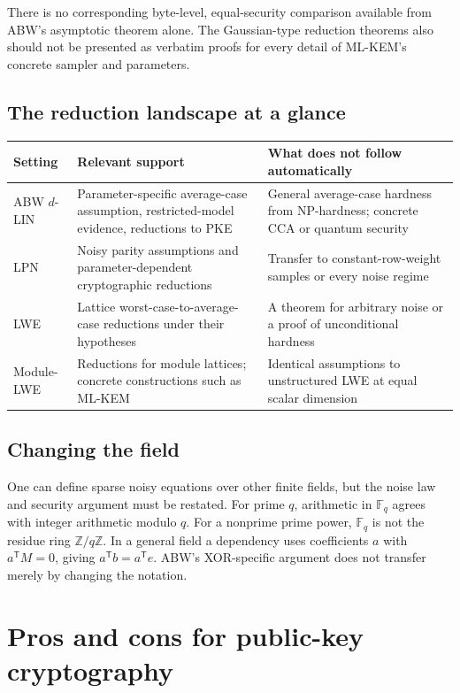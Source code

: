\documentclass[11pt,a4paper]{article}
\newcommand{\F}{\mathbb F}
\newcommand{\Z}{\mathbb Z}
\begin{document}
There is no corresponding byte-level, equal-security comparison available from ABW's asymptotic theorem alone. The Gaussian-type reduction theorems also should not be presented as verbatim proofs for every detail of ML-KEM's concrete sampler and parameters.

\subsection{The reduction landscape at a glance}
\begin{center}\small
\begin{tabularx}{\textwidth}{@{}>{\raggedright\arraybackslash}p{1.5cm}YY@{}}\toprule
Setting & Relevant support & What does not follow automatically\\\midrule
ABW $d$-LIN & Parameter-specific average-case assumption, restricted-model evidence, reductions to PKE & General average-case hardness from NP-hardness; concrete CCA or quantum security\\[4pt]
LPN & Noisy parity assumptions and parameter-dependent cryptographic reductions & Transfer to constant-row-weight samples or every noise regime\\[4pt]
LWE & Lattice worst-case-to-average-case reductions under their hypotheses & A theorem for arbitrary noise or a proof of unconditional hardness\\[4pt]
Module-LWE & Reductions for module lattices; concrete constructions such as ML-KEM & Identical assumptions to unstructured LWE at equal scalar dimension\\\bottomrule
\end{tabularx}\end{center}

\subsection{Changing the field}
One can define sparse noisy equations over other finite fields, but the noise law and security argument must be restated. For prime $q$, arithmetic in $\F_q$ agrees with integer arithmetic modulo $q$. For a nonprime prime power, $\F_q$ is not the residue ring $\Z/q\Z$. In a general field a dependency uses coefficients $a$ with $a^\mathsf TM=0$, giving $a^\mathsf Tb=a^\mathsf Te$. ABW's XOR-specific argument does not transfer merely by changing the notation.

\section{Pros and cons for public-key cryptography}\label{sec:assessment}
\end{document}
